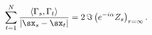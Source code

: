 \begin{equation} \label{distconstr}
\sum_{t=1}^N \frac{\langle \Gamma_s,\Gamma_t
\rangle}{|\sx_s-\sx_t|} = 2 \, \Im\left(e^{-i \alpha} Z_s
\right)_{r=\infty}.
\end{equation}

